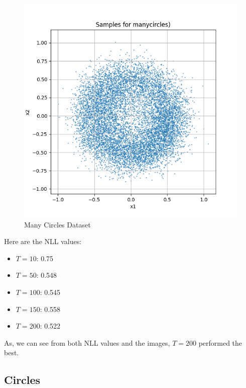 \documentclass[a4paper,12pt]{article}
\begin{document}
\begin{figure}[h]
\begin{minipage}{0.3\textwidth}
  \end{minipage}
  \begin{minipage}{0.3\textwidth}
      \centering
      \includegraphics[width=\linewidth]{"images/Samples for ddpm_2_200_0.0001_0.02_manycircles.png"}
  \end{minipage}

  \caption{Many Circles Dataset}
\end{figure}

Here are the NLL values:
\begin{itemize}
  \item $T = 10$: 0.75
  \item $T = 50$: 0.548
  \item $T = 100$: 0.545
  \item $T = 150$: 0.558
  \item $T = 200$: 0.522
\end{itemize}

As, we can see from both NLL values and the images, $T = 200$ performed the best.

\clearpage

\subsection*{Circles}
\end{document}
